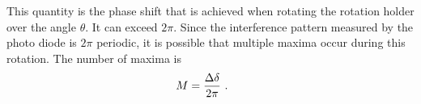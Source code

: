 This quantity is the phase shift that is achieved when rotating the rotation holder over the angle $\theta$. It can exceed $2\pi$. Since the interference pattern measured by the photo diode is $2\pi$ periodic, it is possible that multiple maxima occur during this rotation. The number of maxima is 
\begin{align}
  \label{eq:number_of_maxima}
  M &= \frac{\Delta \delta}{2\pi} \text{ . }
\end{align}



